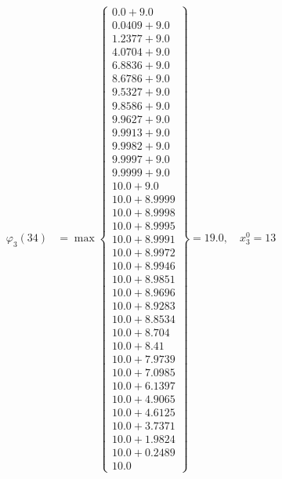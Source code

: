 \documentclass{article}
\begin{document}
\begin{align*}
\varphi_{3}(34) &= \max \left\{ \begin{array}{c}
0.0 + 9.0 \\
 0.0409 + 9.0 \\
 1.2377 + 9.0 \\
 4.0704 + 9.0 \\
 6.8836 + 9.0 \\
 8.6786 + 9.0 \\
 9.5327 + 9.0 \\
 9.8586 + 9.0 \\
 9.9627 + 9.0 \\
 9.9913 + 9.0 \\
 9.9982 + 9.0 \\
 9.9997 + 9.0 \\
 9.9999 + 9.0 \\
 10.0 + 9.0 \\
 10.0 + 8.9999 \\
 10.0 + 8.9998 \\
 10.0 + 8.9995 \\
 10.0 + 8.9991 \\
 10.0 + 8.9972 \\
 10.0 + 8.9946 \\
 10.0 + 8.9851 \\
 10.0 + 8.9696 \\
 10.0 + 8.9283 \\
 10.0 + 8.8534 \\
 10.0 + 8.704 \\
 10.0 + 8.41 \\
 10.0 + 7.9739 \\
 10.0 + 7.0985 \\
 10.0 + 6.1397 \\
 10.0 + 4.9065 \\
 10.0 + 4.6125 \\
 10.0 + 3.7371 \\
 10.0 + 1.9824 \\
 10.0 + 0.2489 \\
 10.0
\end{array} \right\}=19.0, \quad x_{3}^0=13\\
  

\end{align*}
\end{document}
